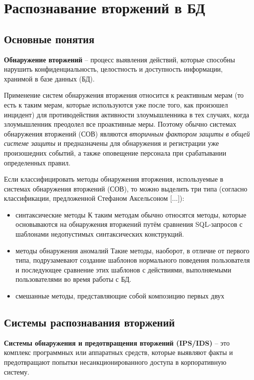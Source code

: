 \section{Распознавание вторжений в БД}
\subsection{Основные понятия}

\textbf{Обнаружение вторжений} -- процесс выявления действий, которые способны нарушить конфиденциальность, 
целостность и доступность информации, хранимой в базе данных (БД).

Применение систем обнаружения вторжения относится к реактивным мерам (то есть к таким мерам, которые 
используются уже после того, как произошел инцидент) для противодействия активности злоумышленника в тех 
случаях, когда злоумышленник преодолел все проактивные меры. Поэтому обычно системах обнаружения вторжений (СОВ) 
являются \textit{вторичным фактором защиты в общей системе защиты} и предназначены для обнаружения и регистрации
уже произошедних событий, а также оповещение персонала при срабатывании определенных правил.

Если классифицировать методы обнаружения вторжения, используемые в системах обнаружения вторжений (СОВ), 
то можно выделить три типа (согласно классификации, предложенной Стефаном Аксельсоном [...]):
\begin{itemize}
	\item синтаксические методы 
		К таким методам обычно относятся методы, которые основываются на обнаружения вторжений 
		путём сравнения SQL-запросов с шаблонами недопустимых синтаксических конструкций.
	\item методы обнаружения аномалий
		Такие методы, наоборот, в отличие от первого типа, подрузамевают создание шаблонов нормального 
		поведения пользователя и последующее сравнение этих шаблонов с действиями, выполняемыми пользователями 
		во время работы с БД.
	\item смешанные методы, представляющие собой композицию первых двух
\end{itemize}

\subsection{Системы распознавания вторжений}

\textbf{Системы обнаружения и предотвращения вторжений (IPS/IDS)} -- это комплекс программных или аппаратных средств, которые выявляют факты и предотвращают попытки несанкционированного доступа в корпоративную систему.

